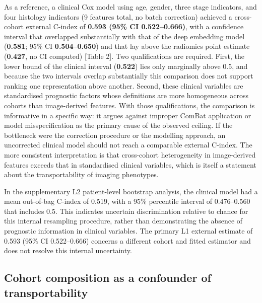 \documentclass[a4paper,fleqn]{cas-sc}
\begin{document}
As a reference, a clinical Cox model using age, gender, three stage indicators, and four histology indicators (9 features total, no batch correction) achieved a cross-cohort external C-index of \textbf{0.593 (95\% CI 0.522--0.666)}, with a confidence interval that overlapped substantially with that of the deep embedding model (\textbf{0.581}; 95\% CI \textbf{0.504--0.650}) and that lay above the radiomics point estimate (\textbf{0.427}, no CI computed) [Table 2]. Two qualifications are required. First, the lower bound of the clinical interval (\textbf{0.522}) lies only marginally above 0.5, and because the two intervals overlap substantially this comparison does not support ranking one representation above another. Second, these clinical variables are standardised prognostic factors whose definitions are more homogeneous across cohorts than image-derived features. With those qualifications, the comparison is informative in a specific way: it argues against improper ComBat application or model misspecification as the primary cause of the observed ceiling. If the bottleneck were the correction procedure or the modelling approach, an uncorrected clinical model should not reach a comparable external C-index. The more consistent interpretation is that cross-cohort heterogeneity in image-derived features exceeds that in standardised clinical variables, which is itself a statement about the transportability of imaging phenotypes.

In the supplementary L2 patient-level bootstrap analysis, the clinical model had a mean out-of-bag C-index of 0.519, with a 95\% percentile interval of 0.476--0.560 that includes 0.5. This indicates uncertain discrimination relative to chance for this internal resampling procedure, rather than demonstrating the absence of prognostic information in clinical variables. The primary L1 external estimate of 0.593 (95\% CI 0.522--0.666) concerns a different cohort and fitted estimator and does not resolve this internal uncertainty.

\subsection{Cohort composition as a confounder of transportability}
\end{document}
